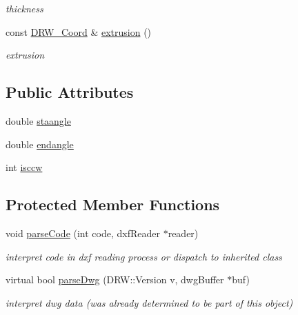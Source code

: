 \begin{DoxyCompactItemize}
\begin{DoxyCompactList}\small\item\em thickness \end{DoxyCompactList}\item 
\hypertarget{class_d_r_w___arc_adeaf1204c08b172ba08106b61f13d4eb}{}const \hyperlink{class_d_r_w___coord}{D\+R\+W\+\_\+\+Coord} \& \hyperlink{class_d_r_w___arc_adeaf1204c08b172ba08106b61f13d4eb}{extrusion} ()\label{class_d_r_w___arc_adeaf1204c08b172ba08106b61f13d4eb}

\begin{DoxyCompactList}\small\item\em extrusion \end{DoxyCompactList}\end{DoxyCompactItemize}
\subsection*{Public Attributes}
\begin{DoxyCompactItemize}
\item 
double \hyperlink{class_d_r_w___arc_a7718d55eb1ddd3c4038be5798f37570e}{staangle}
\item 
double \hyperlink{class_d_r_w___arc_a3425163b91e875fc7ffad0176e0e8183}{endangle}
\item 
int \hyperlink{class_d_r_w___arc_aaacaac1262bc3e4a2e83c13804d1cb00}{isccw}
\end{DoxyCompactItemize}
\subsection*{Protected Member Functions}
\begin{DoxyCompactItemize}
\item 
\hypertarget{class_d_r_w___arc_a837c22a41f1b3eff3c64b10faff85de5}{}void \hyperlink{class_d_r_w___arc_a837c22a41f1b3eff3c64b10faff85de5}{parse\+Code} (int code, dxf\+Reader $\ast$reader)\label{class_d_r_w___arc_a837c22a41f1b3eff3c64b10faff85de5}

\begin{DoxyCompactList}\small\item\em interpret code in dxf reading process or dispatch to inherited class \end{DoxyCompactList}\item 
\hypertarget{class_d_r_w___arc_ab76e7a51ddf6d330373a330d0d610069}{}virtual bool \hyperlink{class_d_r_w___arc_ab76e7a51ddf6d330373a330d0d610069}{parse\+Dwg} (D\+R\+W\+::\+Version v, dwg\+Buffer $\ast$buf)\label{class_d_r_w___arc_ab76e7a51ddf6d330373a330d0d610069}

\begin{DoxyCompactList}\small\item\em interpret dwg data (was already determined to be part of this object) \end{DoxyCompactList}\end{DoxyCompactItemize}


